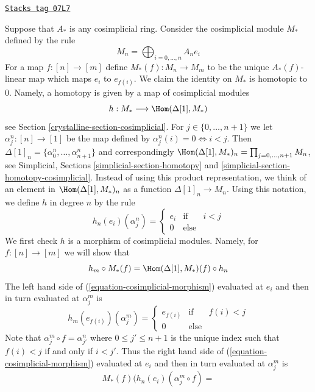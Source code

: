 \begin{example}
\label{crystalline-example-cosimplicial-module}
\href{https://stacks.math.columbia.edu/tag/07L7}{\texttt{Stacks tag 07L7}}

Suppose that $A_*$ is any cosimplicial ring.
Consider the cosimplicial module $M_*$ defined by the rule
$$
M_n = \bigoplus\nolimits_{i = 0, ..., n} A_n e_i
$$
For a map $f : [n] \to [m]$ define $M_*(f) : M_n \to M_m$
to be the unique $A_*(f)$-linear map which maps $e_i$ to $e_{f(i)}$.
We claim the identity on $M_*$ is homotopic to $0$.
Namely, a homotopy is given by a map of cosimplicial modules
$$
h : M_* \longrightarrow \Hom(\Delta[1], M_*)
$$
see Section \ref{crystalline-section-cosimplicial}.
For $j \in \{0, \ldots, n + 1\}$ we let $\alpha^n_j : [n] \to [1]$ be the map
defined by $\alpha^n_j(i) = 0 \Leftrightarrow i < j$. Then
$\Delta[1]_n = \{\alpha^n_0, \ldots, \alpha^n_{n + 1}\}$ and correspondingly
$\Hom(\Delta[1], M_*)_n = \prod_{j = 0, \ldots, n + 1} M_n$, see
Simplicial, Sections \ref{simplicial-section-homotopy} and
\ref{simplicial-section-homotopy-cosimplicial}. Instead of using
this product representation, we think of an element
in $\Hom(\Delta[1], M_*)_n$ as a function $\Delta[1]_n \to M_n$.
Using this notation, we define $h$ in degree $n$ by the rule
$$
h_n(e_i)(\alpha^n_j) =
\left\{
\begin{matrix}
e_{i} & \text{if} & i < j \\
0 & \text{else}
\end{matrix}
\right.
$$
We first check $h$ is a morphism of cosimplicial modules. Namely, for
$f : [n] \to [m]$ we will show that
\begin{equation}
\label{equation-cosimplicial-morphism}
h_m \circ M_*(f) = \Hom(\Delta[1], M_*)(f) \circ h_n
\end{equation}
The left hand side of (\ref{equation-cosimplicial-morphism}) evaluated at
$e_i$ and then in turn evaluated at $\alpha^m_j$ is
$$
h_m(e_{f(i)})(\alpha^m_j) =
\left\{
\begin{matrix}
e_{f(i)} & \text{if} & f(i) < j \\
0 & \text{else}
\end{matrix}
\right.
$$
Note that $\alpha^m_j \circ f = \alpha^n_{j'}$ where
$0 \leq j' \leq n + 1$ is the unique index such that $f(i) < j$
if and only if $i < j'$. Thus the right hand side of
(\ref{equation-cosimplicial-morphism}) evaluated at $e_i$
and then in turn evaluated at $\alpha^m_j$ is
$$
M_*(f)(h_n(e_i)(\alpha^m_j \circ f) =
$$
\end{example}

